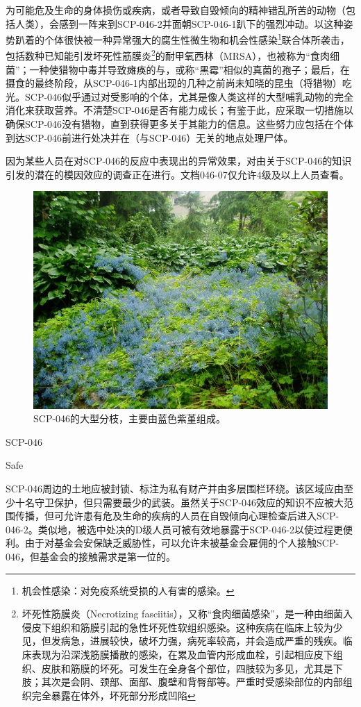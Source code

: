为可能危及生命的身体损伤或疾病，或者导致自毁倾向的精神错乱所苦的动物（包括人类），会感到一阵来到SCP-046-2并面朝SCP-046-1趴下的强烈冲动。以这种姿势趴着的个体很快被一种异常强大的腐生性微生物和机会性感染\footnote{ 机会性感染：对免疫系统受损的人有害的感染。}联合体所袭击，包括数种已知能引发坏死性筋膜炎\footnote{ 坏死性筋膜炎（Necrotizing fasciitis），又称“食肉细菌感染”，是一种由细菌入侵皮下组织和筋膜引起的急性坏死性软组织感染。这种疾病在临床上较为少见，但发病急，进展较快，破坏力强，病死率较高，并会造成严重的残疾。临床表现为沿深浅筋膜播散的感染，在累及血管内形成血栓，引起相应皮下组织、皮肤和筋膜的坏死。可发生在全身各个部位，四肢较为多见，尤其是下肢；其次是会阴、颈部、面部、腹壁和背臀部等。严重时受感染部位的内部组织完全暴露在体外，坏死部分形成凹陷}的耐甲氧西林（MRSA），也被称为“食肉细菌”；一种使猎物中毒并导致瘫痪的与，或称“黑霉”相似的真菌的孢子；最后，在摄食的最终阶段，从SCP-046-1内部出现的几种之前尚未知晓的昆虫（将猎物）吃光。SCP-046似乎通过对受影响的个体，尤其是像人类这样的大型哺乳动物的完全消化来获取营养。不清楚SCP-046是否有能力成长；有鉴于此，应采取一切措施以确保SCP-046没有猎物，直到获得更多关于其能力的信息。这些努力应包括在个体到达SCP-046前进行处决并在（与SCP-046）无关的地点处理尸体。

 因为某些人员在对SCP-046的反应中表现出的异常效果，对由关于SCP-046的知识引发的潜在的模因效应的调查正在进行。文档046-07仅允许4级及以上人员查看。



\begin{figure}[H]
    \centering
    \includegraphics[width=0.5\linewidth]{images/SCP-046-2.jpg}
    \caption*{SCP-046的大型分枝，主要由蓝色紫堇组成。}
\end{figure}

SCP-046

Safe

SCP-046周边的土地应被封锁、标注为私有财产并由多层围栏环绕。该区域应由至少十名守卫保护，但只需要最少的武装。虽然关于SCP-046效应的知识不应被大范围传播，但可允许患有危及生命的疾病的人员在自毁倾向心理检查后进入SCP-046-2。类似地，被选中处决的D级人员可被有效地暴露于SCP-046-2以使过程更便利。由于对基金会安保缺乏威胁性，可以允许未被基金会雇佣的个人接触SCP-046，但基金会的接触需求是第一位的。

